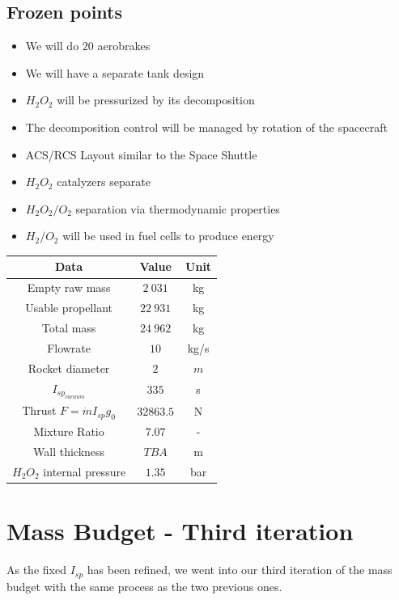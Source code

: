 \subsection{Frozen points}
\begin{itemize}
	\item We will do $20$ aerobrakes
	\item We will have a separate tank design
	\item $H_2O_2$ will be pressurized by its decomposition
	\item The decomposition control will be managed by rotation of the spacecraft
	\item ACS/RCS Layout similar to the Space Shuttle
	\item $H_2O_2$ catalyzers separate
	\item $H_2O_2/O_2$ separation via thermodynamic properties
	\item $H_2/O_2$ will be used in fuel cells to produce energy
\end{itemize}
\begin{center}
	\begin{tabular}[H]{|c|c|c|}
		\hline
		\cellcolor{gray!50}Data & \cellcolor{gray!50}Value & \cellcolor{gray!50}Unit\\
		\hline
		Empty raw mass & $2\ 031$ & kg\\
		\hline
		Usable propellant & $22\ 931$ &kg\\
		\hline
		\cellcolor{green!50}Total mass & \cellcolor{green!50}$24\ 962$ & \cellcolor{green!50}kg\\
		\hline
		Flowrate & $10$ & kg/s\\
		\hline
		Rocket diameter & $2$ & $m$\\
		\hline
		$I_{sp_{vacuum}}$ & $335$ & s\\
		\hline
		Thrust $F=\dot m I_{sp} g_0$ & $32 863.5$ &N\\
		\hline
		Mixture Ratio & $7.07$ & -\\
		\hline
		Wall thickness & $TBA$ & m\\
		\hline
		$H_2O_2$ internal pressure & $1.35$ & bar\\
		\hline
	\end{tabular}
\end{center}
\newpage
\section{Mass Budget - Third iteration}
As the fixed $I_{sp}$ has been refined, we went into our third iteration of the mass budget with the same process as the two previous ones.
